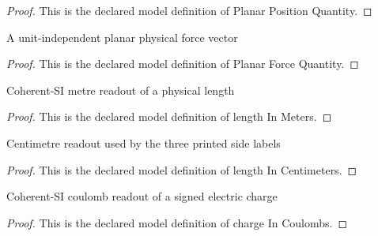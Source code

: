 \begin{proof}
  This is the declared model definition of Planar Position Quantity.
\end{proof}
\begin{definition}
  \label{def:physics:phyx-mini-0894:phyxminiproblems-problemphyxmini0894-planarforcequantity}
  A unit-independent planar physical force vector
\end{definition}
\begin{proof}
  This is the declared model definition of Planar Force Quantity.
\end{proof}
\begin{definition}
  \label{def:physics:phyx-mini-0894:phyxminiproblems-problemphyxmini0894-lengthinmeters}
  Coherent-SI metre readout of a physical length
\end{definition}
\begin{proof}
  This is the declared model definition of length In Meters.
\end{proof}
\begin{definition}
  \label{def:physics:phyx-mini-0894:phyxminiproblems-problemphyxmini0894-lengthincentimeters}
  Centimetre readout used by the three printed side labels
\end{definition}
\begin{proof}
  This is the declared model definition of length In Centimeters.
\end{proof}
\begin{definition}
  \label{def:physics:phyx-mini-0894:phyxminiproblems-problemphyxmini0894-chargeincoulombs}
  Coherent-SI coulomb readout of a signed electric charge
\end{definition}
\begin{proof}
  This is the declared model definition of charge In Coulombs.
\end{proof}
